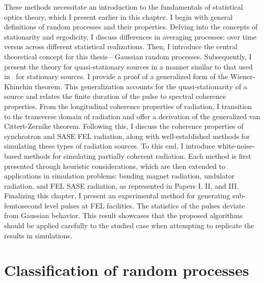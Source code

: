     These methods necessitate an introduction to the fundamentals of statistical optics theory, which I present earlier in this chapter. I begin with general definitions of random processes and their properties. Delving into the concepts of stationarity and ergodicity, I discuss differences in averaging processes: over time versus across different statistical realizations. Then, I introduce the central theoretical concept for this thesis—Gaussian random processes. Subsequently, I present the theory for quasi-stationary sources in a manner similar to that used in~\cite{mandel_optical_1995, goodman_statistical_2015} for stationary sources. I provide a proof of a generalized form of the Wiener-Khinchin theorem. This generalization accounts for the quasi-stationarity of a source and relates the finite duration of the pulse to spectral coherence properties. From the longitudinal coherence properties of radiation, I transition to the transverse domain of radiation and offer a derivation of the generalized van Cittert-Zernike theorem. Following this, I discuss the coherence properties of synchrotron and SASE FEL radiation, along with well-established methods for simulating these types of radiation sources. To this end, I introduce white-noise-based methods for simulating partially coherent radiation. Each method is first presented through heuristic considerations, which are then extended to applications in simulation problems: bending magnet radiation, undulator radiation, and FEL SASE radiation, as represented in Papers I, II, and III. Finalizing this chapter, I present an experimental method for generating sub-femtosecond level pulses at FEL facilities. The statistics of the pulses deviate from Gaussian behavior. This result showcases that the proposed algorithms should be applied carefully to the studied case when attempting to replicate the results in simulations.

\section{Classification of random processes}

    
